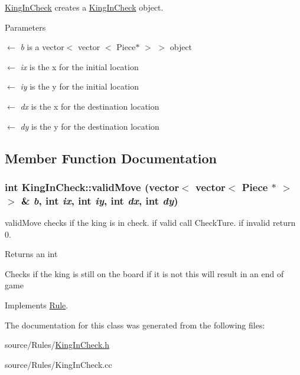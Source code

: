\hyperlink{classKingInCheck}{KingInCheck} creates a \hyperlink{classKingInCheck}{KingInCheck} object. 
\begin{DoxyParams}{Parameters}
\item[\mbox{$\leftarrow$} {\em b}]is a vector$<$ vector $<$ Piece$\ast$ $>$ $>$ object \item[\mbox{$\leftarrow$} {\em ix}]is the x for the initial location \item[\mbox{$\leftarrow$} {\em iy}]is the y for the initial location \item[\mbox{$\leftarrow$} {\em dx}]is the x for the destination location \item[\mbox{$\leftarrow$} {\em dy}]is the y for the destination location \end{DoxyParams}


\subsection{Member Function Documentation}
\hypertarget{classKingInCheck_a5c9860dc659beddf2c8e7e471778c60c}{
\subsubsection[{validMove}]{\setlength{\rightskip}{0pt plus 5cm}int KingInCheck::validMove (vector$<$ vector$<$ {\bf Piece} $\ast$ $>$ $>$ \& {\em b}, \/  int {\em ix}, \/  int {\em iy}, \/  int {\em dx}, \/  int {\em dy})}}
\label{classKingInCheck_a5c9860dc659beddf2c8e7e471778c60c}


validMove checks if the king is in check. if valid call CheckTure. if invalid return 0. \begin{DoxyReturn}{Returns}
an int 
\end{DoxyReturn}


Checks if the king is still on the board if it is not this will result in an end of game 

Implements \hyperlink{classRule}{Rule}.

The documentation for this class was generated from the following files:\begin{DoxyCompactItemize}
\item 
source/Rules/\hyperlink{KingInCheck_8h}{KingInCheck.h}\item 
source/Rules/KingInCheck.cc\end{DoxyCompactItemize}
